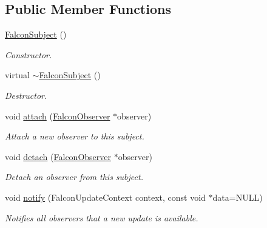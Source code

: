 \subsection*{Public Member Functions}
\begin{DoxyCompactItemize}
\item 
\hypertarget{classFalconSubject_a1c7a53a4d28fbb83d305fd62470bfaa2}{
\hyperlink{classFalconSubject_a1c7a53a4d28fbb83d305fd62470bfaa2}{FalconSubject} ()}
\label{classFalconSubject_a1c7a53a4d28fbb83d305fd62470bfaa2}

\begin{DoxyCompactList}\small\item\em Constructor. \item\end{DoxyCompactList}\item 
\hypertarget{classFalconSubject_afd64db787e2371dc09b73917209f3566}{
virtual \hyperlink{classFalconSubject_afd64db787e2371dc09b73917209f3566}{$\sim$FalconSubject} ()}
\label{classFalconSubject_afd64db787e2371dc09b73917209f3566}

\begin{DoxyCompactList}\small\item\em Destructor. \item\end{DoxyCompactList}\item 
void \hyperlink{classFalconSubject_a081d12a24abd16b88b69230f82ce1ec7}{attach} (\hyperlink{classFalconObserver}{FalconObserver} $\ast$observer)
\begin{DoxyCompactList}\small\item\em Attach a new observer to this subject. \item\end{DoxyCompactList}\item 
void \hyperlink{classFalconSubject_aaa69f14bf9659f783b9d95da47e55868}{detach} (\hyperlink{classFalconObserver}{FalconObserver} $\ast$observer)
\begin{DoxyCompactList}\small\item\em Detach an observer from this subject. \item\end{DoxyCompactList}\item 
void \hyperlink{classFalconSubject_abd19e56b3ffb433705576e361cc5b28f}{notify} (FalconUpdateContext context, const void $\ast$data=NULL)
\begin{DoxyCompactList}\small\item\em Notifies all observers that a new update is available. \item\end{DoxyCompactList}\end{DoxyCompactItemize}



